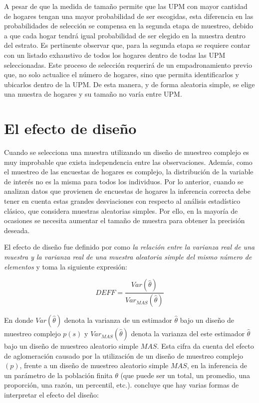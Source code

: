 \documentclass[
  12pt,
  spanish,
]{book}
\begin{document}
A pesar de que la medida de tamaño permite que las UPM con mayor cantidad de hogares tengan una mayor probabilidad de ser escogidas, esta diferencia en las probabilidades de selección se compensa en la segunda etapa de muestreo, debido a que cada hogar tendrá igual probabilidad de ser elegido en la muestra dentro del estrato. Es pertinente observar que, para la segunda etapa se requiere contar con un listado exhaustivo de todos los hogares dentro de todas las UPM seleccionadas. Este proceso de selección requerirá de un empadronamiento previo que, no solo actualice el número de hogares, sino que permita identificarlos y ubicarlos dentro de la UPM. De esta manera, y de forma aleatoria simple, se elige una muestra de hogares y su tamaño no varía entre UPM.

\hypertarget{el-efecto-de-diseuxf1o}{%
\chapter{El efecto de diseño}\label{el-efecto-de-diseuxf1o}}

Cuando se selecciona una muestra utilizando un diseño de muestreo complejo es muy improbable que exista independencia entre las observaciones. Además, como el muestreo de las encuestas de hogares es complejo, la distribución de la variable de interés no es la misma para todos los individuos. Por lo anterior, cuando se analizan datos que provienen de encuestas de hogares la inferencia correcta debe tener en cuenta estas grandes desviaciones con respecto al análisis estadístico clásico, que considera muestras aleatorias simples. Por ello, en la mayoría de ocasiones se necesita aumentar el tamaño de muestra para obtener la precisión deseada.

El efecto de diseño fue definido por \citet[página 258]{Kish_1965} como \emph{la relación entre la varianza real de una muestra y la varianza real de una muestra aleatoria simple del mismo número de elementos} y toma la siguiente expresión:

\[
DEFF=\frac{Var(\hat{\theta})}{Var_{MAS}(\hat{\theta})}
\]

En donde \(Var(\hat{\theta})\) denota la varianza de un estimador \(\hat{\theta}\) bajo un diseño de muestreo complejo \(p(s)\) y \(Var_{MAS}(\hat{\theta})\) denota la varianza del este estimador \(\hat{\theta}\) bajo un diseño de muestreo aleatorio simple \(MAS\). Esta cifra da cuenta del efecto de aglomeración causado por la utilización de un diseño de muestreo complejo \((p)\), frente a un diseño de muestreo aleatorio simple \(MAS\), en la inferencia de un parámetro de la población finita \(\theta\) (que puede ser un total, un promedio, una proporción, una razón, un percentil, etc.). \citet[p.~49]{United_Nations_2008} concluye que hay varias formas de interpretar el efecto del diseño:
\end{document}
